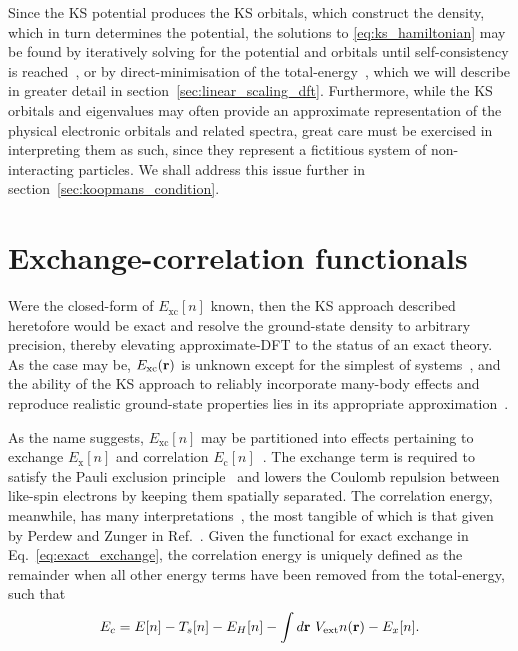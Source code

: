 Since the KS potential produces the KS orbitals, 
which construct the density, 
which in turn determines the potential, 
the solutions to \eqref{eq:ks_hamiltonian} 
{may be found by iteratively solving for the potential and orbitals 
until self-consistency is reached~\cite{martin2004electronic}, 
or by direct-minimisation of the total-energy~\cite{skylaris2005introducing}, 
which we will describe in greater detail in section~\ref{sec:linear_scaling_dft}.} 
%
Furthermore, while the KS orbitals and eigenvalues 
may often provide an approximate representation of 
the physical electronic orbitals and related spectra, 
great care must be exercised in interpreting them as such,  
since they represent a fictitious system 
of non-interacting particles. 
% 
{We shall address this issue further 
in section~\ref{sec:koopmans_condition}.}

\section{Exchange-correlation functionals}
\label{sec:xc_functionals}

Were the closed-form 
of $E_\textrm{xc}[n]$ known, 
then the KS approach described heretofore 
would be exact 
and resolve the ground-state density 
to arbitrary precision, 
thereby elevating approximate-DFT 
to the status of an exact theory. 
%
As the case may be, 
$E_\textrm{xc}({\bf r})$ is unknown 
except for the simplest of systems~\cite{PhysRevA.93.042511,PhysRevA.83.062512,Matito2016,PhysRevLett.109.036402}, 
and the ability of the KS approach 
to reliably incorporate many-body effects 
and reproduce realistic ground-state properties 
lies in its {appropriate approximation}~\cite{PhysRev.140.A1133}.

As the name suggests, 
$E_\textrm{xc}[n]$ 
may be {partitioned} into effects 
pertaining to exchange $E_\textrm{x}[n]$ 
and correlation $E_\textrm{c}[n]$~\cite{CAPELLE2006}.
%
The exchange term is required to satisfy 
the Pauli exclusion principle~\cite{PhysRev.58.716} 
and lowers the Coulomb repulsion 
between like-spin electrons 
by keeping them spatially separated.
%
{The correlation energy, meanwhile, 
has many interpretations~\cite{CAPELLE2006,doi:10.1021/jacs.5b12434}, 
the most tangible of which is that given 
by Perdew and Zunger in Ref.~\cite{PhysRevB.23.5048}.
%
Given the functional for exact exchange in 
Eq.~\eqref{eq:exact_exchange}, 
the correlation energy is uniquely defined 
as the remainder when all other energy terms 
have been removed from the total-energy, 
such that 
%
\begin{equation}
E_c=E[n]-T_s[n]-E_H[n]-\int d\br\ V_\textrm{ext}n(\br)-E_x[n].
\end{equation}
}\vspace{-1em}

